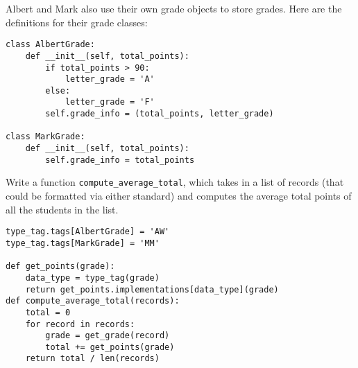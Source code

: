 \question Albert and Mark also use their own grade objects to store
grades. Here are the definitions for their grade classes:

\begin{lstlisting}
class AlbertGrade:
    def __init__(self, total_points):
        if total_points > 90:
            letter_grade = 'A'
        else:
            letter_grade = 'F'
        self.grade_info = (total_points, letter_grade)

class MarkGrade:
    def __init__(self, total_points):
        self.grade_info = total_points
\end{lstlisting}

Write a function {\tt compute\_average\_total}, which takes in a list
of records (that could be formatted via either standard) and computes
the average total points of all the students in the list.
\begin{solution}[.2in]
\begin{lstlisting}
type_tag.tags[AlbertGrade] = 'AW'
type_tag.tags[MarkGrade] = 'MM'

def get_points(grade):
    data_type = type_tag(grade)
    return get_points.implementations[data_type](grade)
def compute_average_total(records):
    total = 0
    for record in records:
        grade = get_grade(record)
        total += get_points(grade)
    return total / len(records)
\end{lstlisting}
\end{solution}

